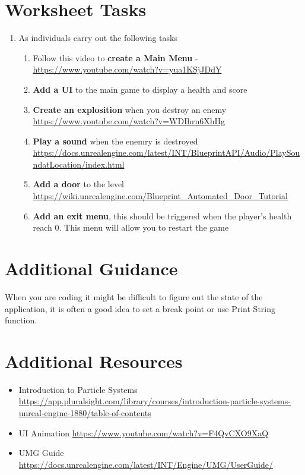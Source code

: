 \documentclass{../../../fal_assignment}
\begin{document}
\section*{Worksheet Tasks}

\begin{enumerate}
	\item As individuals carry out the following tasks
  	\begin{enumerate}[label=(\Alph*)]
      \item Follow this video to \textbf{create a Main Menu} - \url{https://www.youtube.com/watch?v=yua1KSjJDdY}
      \item \textbf{Add a UI} to the main game to display a health and score
      \item \textbf{Create an explosition} when you destroy an enemy \url{https://www.youtube.com/watch?v=WDIhrn6XhHg}
      \item \textbf{Play a sound} when the enemry is destroyed \url{https://docs.unrealengine.com/latest/INT/BlueprintAPI/Audio/PlaySoundatLocation/index.html}
      \item \textbf{Add a door} to the level \url{https://wiki.unrealengine.com/Blueprint_Automated_Door_Tutorial}
      \item \textbf{Add an exit menu}, this should be triggered when the player's health reach 0. This menu will allow you to restart the game
    \end{enumerate}
\end{enumerate}

\section*{Additional Guidance}
When you are coding it might be difficult to figure out the state of the application, it is often a good idea to set a break point or use Print String function.


\section*{Additional Resources}

\begin{itemize}
  \item Introduction to Particle Systems \url{https://app.pluralsight.com/library/courses/introduction-particle-systems-unreal-engine-1880/table-of-contents}
  \item UI Animation \url{https://www.youtube.com/watch?v=F4QvCXO9XaQ}
  \item UMG Guide \url{https://docs.unrealengine.com/latest/INT/Engine/UMG/UserGuide/}
\end{itemize}
\end{document}
